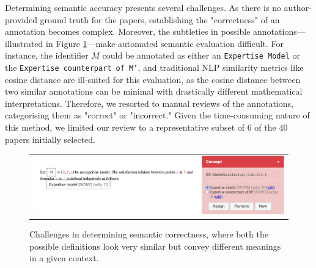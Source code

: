 Determining semantic accuracy presents several challenges. As there is no author-provided ground truth for the papers, establishing the "correctness" of an annotation becomes complex. Moreover, the subtleties in possible annotations—illustrated in Figure \ref{fig:semantic-incorrectness}—make automated semantic evaluation difficult. For instance, the identifier $\mathbf{}{M}$ could be annotated as either an \texttt{Expertise Model} or the \texttt{Expertise counterpart of M'}, and traditional NLP similarity metrics like cosine distance are ill-suited for this evaluation, as the cosine distance between two similar annotations can be minimal with drastically different mathematical interpretations. Therefore, we resorted to manual reviews of the annotations, categorising them as "correct" or "incorrect." Given the time-consuming nature of this method, we limited our review to a representative subset of 6 of the 40 papers initially selected.

\begin{figure}[htpb]
  \centering
  \begin{tabular}{c}
    \includegraphics[width=14cm]{images/semantic-incorrectness.png}
  \end{tabular}
  \caption[Semantic Correctness]{Challenges in determining semantic correctness, where both the possible definitions look very similar but convey different meanings in a given context.}\label{fig:semantic-incorrectness}
\end{figure}
